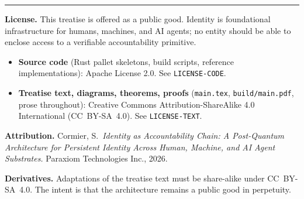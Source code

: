 \documentclass[11pt,a4paper,parskip=half-,DIV=12,headings=standardclasses]{scrartcl}
\theoremstyle{ncthm}
\theoremstyle{ncdef}
\begin{document}
\bigskip
\hrule
\bigskip

\noindent\textbf{License.}\;\;
This treatise is offered as a public good. Identity is foundational
infrastructure for humans, machines, and AI agents; no entity should
be able to enclose access to a verifiable accountability primitive.

\begin{itemize}
\item \textbf{Source code} (Rust pallet skeletons, build scripts,
  reference implementations): Apache License 2.0. See
  \texttt{LICENSE-CODE}.
\item \textbf{Treatise text, diagrams, theorems, proofs}
  (\texttt{main.tex}, \texttt{build/main.pdf}, prose throughout):
  Creative Commons Attribution-ShareAlike 4.0 International
  (CC~BY-SA~4.0). See \texttt{LICENSE-TEXT}.
\end{itemize}

\noindent\textbf{Attribution.}\;\;
Cormier, S.\ \emph{Identity as Accountability Chain: A Post-Quantum
Architecture for Persistent Identity Across Human, Machine, and AI
Agent Substrates.} Paraxiom Technologies Inc., 2026.

\noindent\textbf{Derivatives.}\;\;
Adaptations of the treatise text must be share-alike under
CC~BY-SA~4.0. The intent is that the architecture remains a public
good in perpetuity.
\end{document}
